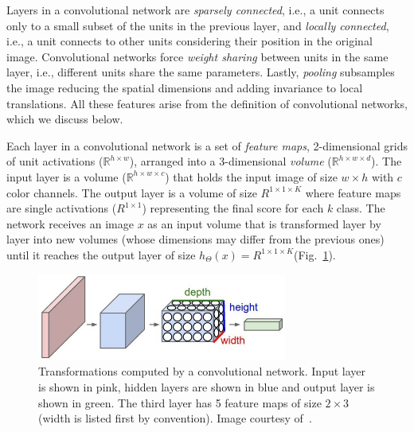 Layers in a convolutional network are \emph{sparsely connected}, i.e., a unit connects only to a small subset of the units in the previous layer, and \emph{locally connected}, i.e., a unit connects to other units considering their position in the original image. Convolutional networks force \emph{weight sharing} between units in the same layer, i.e., different units share the same parameters. Lastly, \emph{pooling} subsamples the image reducing the spatial dimensions and adding invariance to local translations. All these features arise from the definition of convolutional networks, which we discuss below.

Each layer in a convolutional network is a set of \emph{feature maps}, 2-dimensional grids of unit activations ($\mathbb{R}^{h\times w}$), arranged into a 3-dimensional \emph{volume} ($\mathbb{R}^{h\times w \times d}$).
The input layer is a volume ($\mathbb{R}^{h\times w \times c}$) that holds the input image of size $w\times h$ with $c$ color channels. The output layer is a volume of size $R^{1\times 1 \times K}$ where feature maps are single activations ($R^{1\times 1}$) representing the final score for each $k$ class. The network receives an image $x$ as an input volume that is transformed layer by layer into new volumes (whose dimensions may differ from the previous ones) until it reaches the output layer of size $h_\Theta(x) = R^{1\times 1 \times K}$(Fig.~\ref{fig:ConvNetVolumes}).

\begin{figure}[h]
	\centering
	\includegraphics[width = 0.73\textwidth]{plots/convNetVolumes.jpeg}
	\caption[Illustration of a convolutional network]{Transformations computed by a convolutional network. Input layer is shown in pink, hidden layers are shown in blue and output layer is shown in green. The third layer has 5 feature maps of size $2\times3$ (width is listed first by convention). Image courtesy of~\cite{Karpathy2015}.}
	\label{fig:ConvNetVolumes}
\end{figure}

